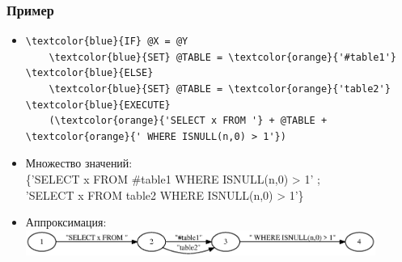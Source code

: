 \documentclass{beamer}
\begin{document}
\begin{frame}[fragile]
	\transwipe[direction=90]
	\frametitle{Пример}
		\begin{itemize}
	\item
		\begin{Verbatim}[commandchars=\\\{\}]
\textcolor{blue}{IF} @X = @Y
    \textcolor{blue}{SET} @TABLE = \textcolor{orange}{'#table1'}
\textcolor{blue}{ELSE}
    \textcolor{blue}{SET} @TABLE = \textcolor{orange}{'table2'}
\textcolor{blue}{EXECUTE} 
    (\textcolor{orange}{'SELECT x FROM '} + @TABLE + \textcolor{orange}{' WHERE ISNULL(n,0) > 1'})
		\end{Verbatim}
     	\item Множество значений: \\ \{'SELECT x FROM \#table1 WHERE ISNULL(n,0) > 1' ; \\ \vspace{2pt} 'SELECT x FROM table2 WHERE ISNULL(n,0) > 1'\}
    	\item Аппроксимация: 
                \includegraphics[width = 0.9\textwidth]{picts/approximation1.eps}

	\end{itemize}

\end{frame}
\end{document}
